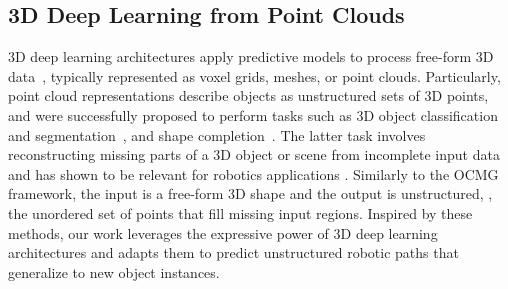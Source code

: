 \subsection{3D Deep Learning from Point Clouds}
\label{sec:3dpointclouds}
3D deep learning architectures apply predictive models to process free-form 3D data~\cite{ahmed2018survey}, typically represented as voxel grids, meshes, or point clouds.
Particularly, point cloud representations describe objects as unstructured sets of 3D points, and were successfully proposed to perform tasks such as 3D object classification~\cite{Qi_Pointnet_2017} and segmentation~\cite{Qi_Pointnet++_2017}, and shape completion~\cite{Yuan_Pcn_2018,Alliegro_Denoise_2021}.
The latter task involves reconstructing missing parts of a 3D object or scene from incomplete input data and has shown to be relevant for robotics applications \cite{completionHumanoids,3dsgrasp}.
Similarly to the OCMG framework, the input is a free-form 3D shape and the output is unstructured, \ie, the unordered set of points that fill missing input regions.
%
Inspired by these methods, our work leverages the expressive power of 3D deep learning architectures and adapts them to predict unstructured robotic paths that generalize to new object instances.

